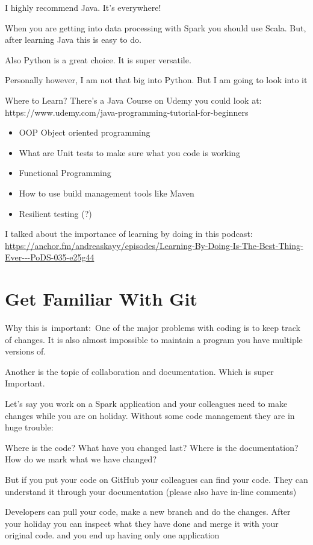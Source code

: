 \documentclass[12pt, numbers=noenddot]{scrreprt} %
\begin{document}
I highly recommend Java. It’s everywhere!

When you are getting into data processing with Spark you should use Scala. But, after learning Java this is easy to do.

Also Python is a great choice. It is super versatile.

Personally however, I am not that big into Python. But I am going to look into it

Where to Learn?
There’s a Java Course on Udemy you could look at: https://www.udemy.com/java-programming-tutorial-for-beginners

\begin{itemize}
\item OOP Object oriented programming
\item What are Unit tests to make sure what you code is working
\item Functional Programming
\item How to use build management tools like Maven
\item Resilient testing (?)
\end{itemize}
I talked about the importance of learning by doing in this podcast: 
\url{https://anchor.fm/andreaskayy/episodes/Learning-By-Doing-Is-The-Best-Thing-Ever---PoDS-035-e25g44}

\chapter{Get Familiar With Git}
Why this is important: One of the major problems with coding is to keep track of changes. It is also almost impossible to maintain a program you have multiple versions of.

Another is the topic of collaboration and documentation. Which is super Important.

Let’s say you work on a Spark application and your colleagues need to make changes while you are on holiday. Without some code management they are in huge trouble:

Where is the code? What have you changed last? Where is the documentation? How do we mark what we have changed?

But if you put your code on GitHub your colleagues can find your code. They can understand it through your documentation (please also have in-line comments)

Developers can pull your code, make a new branch and do the changes. After your holiday you can inspect what they have done and merge it with your original code. and you end up having only one application
\end{document}
